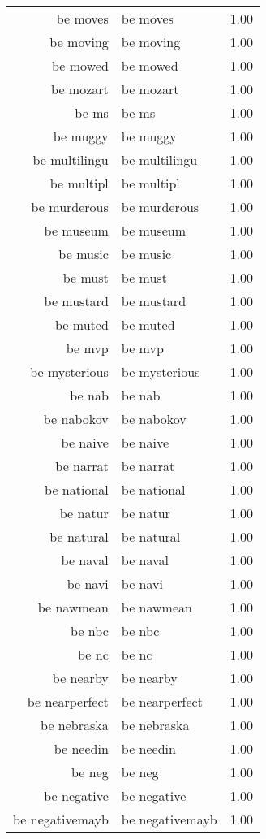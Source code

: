 \begin{table}[ht]
\begin{tabular}{rlr}
  be moves & be moves & 1.00 \\ 
  be moving & be moving & 1.00 \\ 
  be mowed & be mowed & 1.00 \\ 
  be mozart & be mozart & 1.00 \\ 
  be ms & be ms & 1.00 \\ 
  be muggy & be muggy & 1.00 \\ 
  be multilingu & be multilingu & 1.00 \\ 
  be multipl & be multipl & 1.00 \\ 
  be murderous & be murderous & 1.00 \\ 
  be museum & be museum & 1.00 \\ 
  be music & be music & 1.00 \\ 
  be must & be must & 1.00 \\ 
  be mustard & be mustard & 1.00 \\ 
  be muted & be muted & 1.00 \\ 
  be mvp & be mvp & 1.00 \\ 
  be mysterious & be mysterious & 1.00 \\ 
  be nab & be nab & 1.00 \\ 
  be nabokov & be nabokov & 1.00 \\ 
  be naive & be naive & 1.00 \\ 
  be narrat & be narrat & 1.00 \\ 
  be national & be national & 1.00 \\ 
  be natur & be natur & 1.00 \\ 
  be natural & be natural & 1.00 \\ 
  be naval & be naval & 1.00 \\ 
  be navi & be navi & 1.00 \\ 
  be nawmean & be nawmean & 1.00 \\ 
  be nbc & be nbc & 1.00 \\ 
  be nc & be nc & 1.00 \\ 
  be nearby & be nearby & 1.00 \\ 
  be nearperfect & be nearperfect & 1.00 \\ 
  be nebraska & be nebraska & 1.00 \\ 
  be needin & be needin & 1.00 \\ 
  be neg & be neg & 1.00 \\ 
  be negative & be negative & 1.00 \\ 
  be negativemayb & be negativemayb & 1.00 \\ 

\end{tabular}
\end{table}
